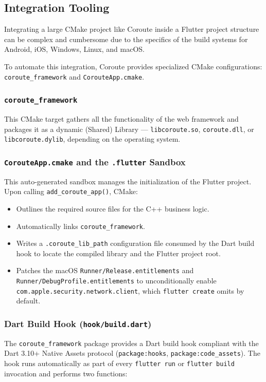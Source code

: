 \subsection{Integration Tooling}
Integrating a large CMake project like Coroute inside a Flutter project structure can be complex and cumbersome due to the specifics of the build systems for Android, iOS, Windows, Linux, and macOS.

To automate this integration, Coroute provides specialized CMake configurations: \texttt{coroute\_framework} and \texttt{CorouteApp.cmake}.

\subsubsection{\texttt{coroute\_framework}}
This CMake target gathers all the functionality of the web framework and packages it as a dynamic (Shared) Library --- \texttt{libcoroute.so}, \texttt{coroute.dll}, or \texttt{libcoroute.dylib}, depending on the operating system.

\subsubsection{\texttt{CorouteApp.cmake} and the \texttt{.flutter} Sandbox}
This auto-generated sandbox manages the initialization of the Flutter project. Upon calling \texttt{add\_coroute\_app()}, CMake:
\begin{itemize}
    \item Outlines the required source files for the C++ business logic.
    \item Automatically links \texttt{coroute\_framework}.
    \item Writes a \texttt{.coroute\_lib\_path} configuration file consumed by the Dart build hook to locate the compiled library and the Flutter project root.
    \item Patches the macOS \texttt{Runner/Release.entitlements} and \texttt{Runner/DebugProfile.entitlements} to unconditionally enable \texttt{com.apple.security.network.client}, which \texttt{flutter create} omits by default.
\end{itemize}

\subsubsection{Dart Build Hook (\texttt{hook/build.dart})}
The \texttt{coroute\_framework} package provides a Dart build hook compliant with the Dart 3.10+ Native Assets protocol (\texttt{package:hooks}, \texttt{package:code\_assets}). The hook runs automatically as part of every \texttt{flutter run} or \texttt{flutter build} invocation and performs two functions:

